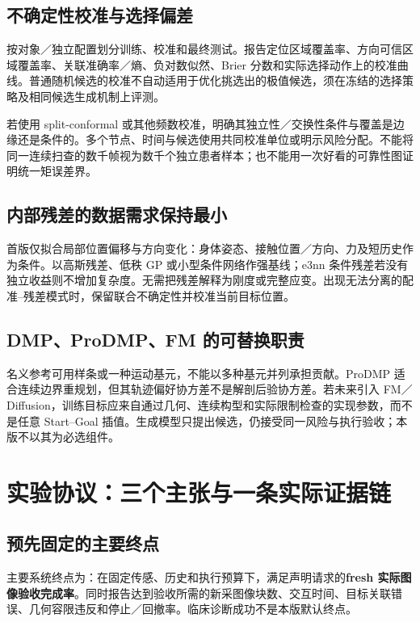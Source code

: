 \documentclass[UTF8,fontset=fandol,11pt,a4paper]{ctexart}
\theoremstyle{plain}
\theoremstyle{definition}
\theoremstyle{remark}
\numberwithin{equation}{section}
\begin{document}
\subsection{不确定性校准与选择偏差}
按对象／独立配置划分训练、校准和最终测试。报告定位区域覆盖率、方向可信区域覆盖率、关联准确率／熵、负对数似然、Brier 分数和实际选择动作上的校准曲线。普通随机候选的校准不自动适用于优化挑选出的极值候选，须在冻结的选择策略及相同候选生成机制上评测。

若使用 split-conformal 或其他频数校准，明确其独立性／交换性条件与覆盖是边缘还是条件的。多个节点、时间与候选使用共同校准单位或明示风险分配。不能将同一连续扫查的数千帧视为数千个独立患者样本；也不能用一次好看的可靠性图证明统一矩误差界。

\subsection{内部残差的数据需求保持最小}
首版仅拟合局部位置偏移与方向变化：身体姿态、接触位置／方向、力及短历史作为条件。以高斯残差、低秩 GP 或小型条件网络作强基线；e3nn 条件残差若没有独立收益则不增加复杂度。无需把残差解释为刚度或完整应变。出现无法分离的配准--残差模式时，保留联合不确定性并校准当前目标位置。

\subsection{DMP、ProDMP、FM 的可替换职责}
名义参考可用样条或一种运动基元，不能以多种基元并列承担贡献。ProDMP 适合连续边界重规划，但其轨迹偏好协方差不是解剖后验协方差\cite{prodmp}。若未来引入 FM／Diffusion，训练目标应来自通过几何、连续构型和实际限制检查的实现参数，而不是任意 Start--Goal 插值。生成模型只提出候选，仍接受同一风险与执行验收；本版不以其为必选组件。

\section{实验协议：三个主张与一条实际证据链}
\label{sec:experiments}
\subsection{预先固定的主要终点}
主要系统终点为：在固定传感、历史和执行预算下，满足声明请求的\textbf{fresh 实际图像验收完成率}。同时报告达到验收所需的新采图像块数、交互时间、目标关联错误、几何容限违反和停止／回撤率。临床诊断成功不是本版默认终点。
\end{document}
